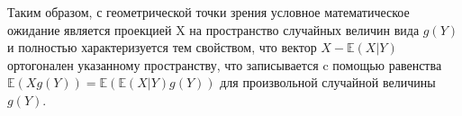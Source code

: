 Таким образом, с геометрической точки зрения условное математическое ожидание является проекцией X на пространство случайных величин вида $g(Y)$ и полностью характеризуется тем свойством, что вектор $X - \mathbb{E}(X|Y)$ ортогонален указанному пространству, что записывается c помощью равенства $\mathbb{E}(Xg(Y)) = \mathbb{E}(\mathbb{E}(X|Y)g(Y))$ для произвольной случайной величины $g(Y)$.
